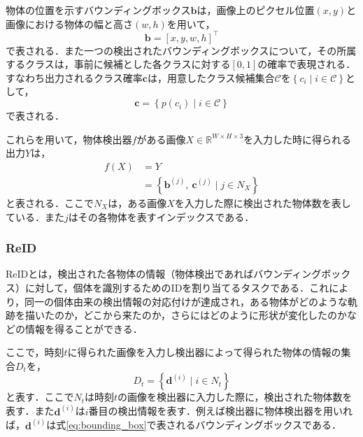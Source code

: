     物体の位置を示すバウンディングボックス$\bm{b}$は，画像上のピクセル位置$(x, y)$と画像における物体の幅と高さ$(w,h)$を用いて，
    \begin{equation}
        \label{eq:bounding_box}
        \bm{b} = \left[x, y, w, h\right]^{\top}
    \end{equation}
    で表される．また一つの検出されたバウンディングボックスについて，その所属するクラスは，事前に候補とした各クラスに対する$[0, 1]$の確率で表現される．すなわち出力されるクラス確率$\bm{c}$は，用意したクラス候補集合$\mathcal{C}$を$\left\{c_i \mid i \in \mathcal{C}\right\}$として，
    \begin{equation}
        \label{eq:class_probability}
        \bm{c} = \left\{p(c_i) \mid i \in \mathcal{C}\right\}
    \end{equation}
    で表される．

    これらを用いて，物体検出器$f$がある画像$X \in \mathbb{R}^{W \times H \times 3}$を入力した時に得られる出力$Y$は，
    \begin{equation}
        \label{eq:object_detection}
        \begin{aligned}
            f(X) &= Y
            \\ &= \left\{\bm{b}^{(j)}, ~\bm{c}^{(j)} \mid j \in N_X\right\}
        \end{aligned}
    \end{equation}
    と表される．ここで$N_X$は，ある画像$X$を入力した際に検出された物体数を表している．また$j$はその各物体を表すインデックスである．

    \subsubsection{ReID}
    ReIDとは，検出された各物体の情報（物体検出であればバウンディングボックス）に対して，個体を識別するためのIDを割り当てるタスクである．これにより，同一の個体由来の検出情報の対応付けが達成され，ある物体がどのような軌跡を描いたのか，どこから来たのか，さらにはどのように形状が変化したのかなどの情報を得ることができる．

    ここで，時刻$t$に得られた画像を入力し検出器によって得られた物体の情報の集合$D_t$を，
    \begin{equation}
        \label{eq:input_to_reid}
        D_t = \left\{\bm{d}^{(i)} \mid i \in N_t\right\}
    \end{equation}
    と表す．ここで$N_t$は時刻$t$の画像を検出器に入力した際に，検出された物体数を表す．また$\bm{d}^{(i)}$は$i$番目の検出情報を表す．例えば検出器に物体検出器を用いれば，$\bm{d}^{(i)}$は式\ref{eq:bounding_box}で表されるバウンディングボックスである．

